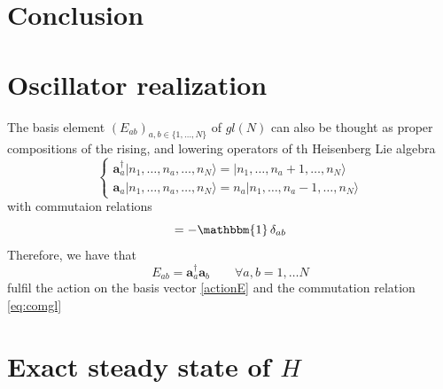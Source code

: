 \documentclass[10pt]{article}
\numberwithin{equation}{section}
\numberwithin{equation}{subsection}
\newcommand{\oa}{\mathbf{a}}
\newcommand{\oad}{\mathbf{a}^{\dagger}}
\begin{document}
\section{Conclusion}








\appendix
\section{Oscillator realization}\label{appA}

 The basis element $ (E_{ab})_{a,b\in\{1,\ldots,N\}}$ of $gl(N)$ can also be thought as proper compositions of the rising, and lowering operators of th Heisenberg Lie algebra
  \begin{equation}\label{creationOperators}
	\begin{cases}
	\oad_{a}|n_{1},\ldots,n_{a},\ldots,n_{N}\rangle = |n_{1},\ldots,n_{a}+1,\ldots,n_{N}\rangle\\
	\oa_{a}|n_{1},\ldots,n_{a},\ldots,n_{N}\rangle =n_{a}|n_{1},\ldots,n_{a}-1,\ldots,n_{N}\rangle
	\end{cases}
\end{equation}
with commutaion relations
\begin{equation}
	[\oad_{a},\oa_{b}]=-\mathbbm{1}\,\delta_{ab}
\end{equation}
Therefore, we have that 
\begin{equation}
		E_{ab}=\oad_{a}\oa_{b}\qquad \forall a,b=1,\ldots N
\end{equation} 
fulfil the action on the basis vector \eqref{actionE} and the commutation relation \eqref{eq:comgl} 
\section{Exact steady state of $H$}\label{subsectionSSH}
\end{document}
